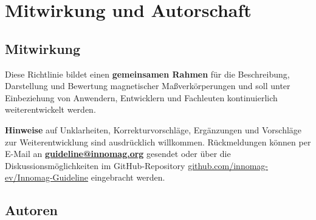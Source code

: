 \documentclass[
  ngerman,
  a4paper,
  twoside]{scrbook}
\makeatletter
\newcommand{\innomag@addcontentsline}[3]{%
  \ifstrequal{#1}{toc}{%
    \ifstrequal{#2}{chapter}{%
      \IfBeginWith{\@currentHref}{chapter.}{}{%
        \phantomsection
      }%
    }{}%
  }{}%
  \innomag@originaladdcontentsline{#1}{#2}{#3}%
}
\let\innomag@originaladdcontentsline\addcontentsline
\let\addcontentsline\innomag@addcontentsline
\renewcommand*\contentsname{Inhaltsverzeichnis}
\newcommand\contentsname{Inhaltsverzeichnis}
\makeatother
\begin{document}






\renewcommand*\contentsname{Inhaltsverzeichnis}
{
\setcounter{tocdepth}{1}
\tableofcontents
}
\listoffigures
\listoftables

\mainmatter
{}

\chapter*{Mitwirkung und Autorschaft}\label{mitwirkung-und-autorschaft}


\section*{Mitwirkung}\label{mitwirkung}


Diese Richtlinie bildet einen \textbf{gemeinsamen Rahmen} für die
Beschreibung, Darstellung und Bewertung magnetischer Maßverkörperungen
und soll unter Einbeziehung von Anwendern, Entwicklern und Fachleuten
kontinuierlich weiterentwickelt werden.

\textbf{Hinweise} auf Unklarheiten, Korrekturvorschläge, Ergänzungen und
Vorschläge zur Weiterentwicklung sind ausdrücklich willkommen.
Rückmeldungen können per E-Mail an
\href{mailto:guideline@innomag.org}{\textbf{guideline@innomag.org}}
gesendet oder über die Diskussionsmöglichkeiten im GitHub-Repository
\href{https://github.com/innomag-ev/Innomag-Guideline}{github.com/innomag-ev/Innomag-Guideline}
eingebracht werden.

\section*{Autoren}\label{autoren}
\end{document}
